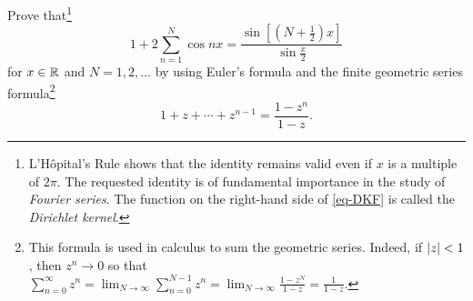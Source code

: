 \documentclass{../math135}
\begin{document}
\begin{exercise}
	Prove that\footnote{L'H\^opital's Rule shows that the identity
    remains valid even if \(x\) is a multiple of \(2\pi\).  The
    requested identity is of fundamental importance in the study of
    \emph{Fourier series}.  The function on the right-hand side of
    \eqref{eq-DKF} is called the \emph{Dirichlet kernel}.}
	\begin{equation}
		1 + 2 \sum_{n=1}^N \cos nx = \frac{ \sin[ (N + \frac{1}{2})x] }{ \sin  \tfrac{x}{2}}\label{eq-DKF}
	\end{equation}
	for \(x \in \mathbb R\) and \(N = 1,2,\ldots\) by using Euler's formula
  and the finite geometric series formula\footnote{This formula is
    used in calculus to sum the geometric series.  Indeed, if
    \(\lvert z\rvert < 1\), then \(z^n \to 0\) so that
    \(\sum_{n=0}^{\infty} z^n = \lim_{N\to\infty} \sum_{n=0}^{N-1} z^n
    = \lim_{N\to\infty}\frac{1 - z^N}{1-z} = \frac{1}{1-z}\).}
	\begin{equation*}
		1+ z + \cdots + z^{n-1} = \frac{1-z^n}{1-z}.
	\end{equation*}

  \begin{solution}
  \end{solution}

\end{exercise}
\end{document}
